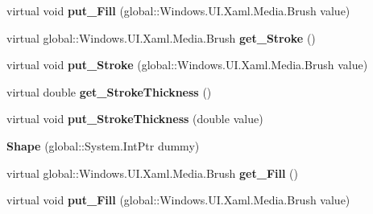 \begin{DoxyCompactItemize}
\mbox{\label{class_windows_1_1_u_i_1_1_xaml_1_1_shapes_1_1_shape_ab293dba968233df2740d66a0e1f23957}} 
virtual void {\bfseries put\+\_\+\+Fill} (global\+::\+Windows.\+U\+I.\+Xaml.\+Media.\+Brush value)
\item 
\mbox{\label{class_windows_1_1_u_i_1_1_xaml_1_1_shapes_1_1_shape_ac48e00b135fa8e1130bee32942bbee5c}} 
virtual global\+::\+Windows.\+U\+I.\+Xaml.\+Media.\+Brush {\bfseries get\+\_\+\+Stroke} ()
\item 
\mbox{\label{class_windows_1_1_u_i_1_1_xaml_1_1_shapes_1_1_shape_a801ec283f413b3ba03d57ce8b2bccdc0}} 
virtual void {\bfseries put\+\_\+\+Stroke} (global\+::\+Windows.\+U\+I.\+Xaml.\+Media.\+Brush value)
\item 
\mbox{\label{class_windows_1_1_u_i_1_1_xaml_1_1_shapes_1_1_shape_a758d9f0e1b12c843580d28f3254f63ca}} 
virtual double {\bfseries get\+\_\+\+Stroke\+Thickness} ()
\item 
\mbox{\label{class_windows_1_1_u_i_1_1_xaml_1_1_shapes_1_1_shape_a3bfb547dd85a92a03c0f72a2ca6af30d}} 
virtual void {\bfseries put\+\_\+\+Stroke\+Thickness} (double value)
\item 
\mbox{\label{class_windows_1_1_u_i_1_1_xaml_1_1_shapes_1_1_shape_aef3c79f20646c23080a348eb29a0394e}} 
{\bfseries Shape} (global\+::\+System.\+Int\+Ptr dummy)
\item 
\mbox{\label{class_windows_1_1_u_i_1_1_xaml_1_1_shapes_1_1_shape_a10c17e0315cc803297aef00e98586e85}} 
virtual global\+::\+Windows.\+U\+I.\+Xaml.\+Media.\+Brush {\bfseries get\+\_\+\+Fill} ()
\item 
\mbox{\label{class_windows_1_1_u_i_1_1_xaml_1_1_shapes_1_1_shape_ab293dba968233df2740d66a0e1f23957}} 
virtual void {\bfseries put\+\_\+\+Fill} (global\+::\+Windows.\+U\+I.\+Xaml.\+Media.\+Brush value)

\end{DoxyCompactItemize}
